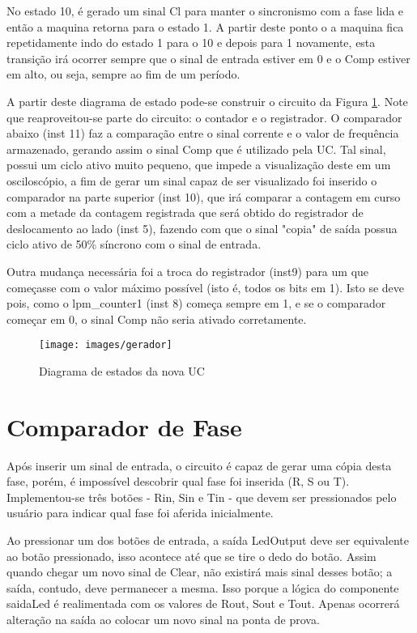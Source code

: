 \documentclass[12pt,a4paper,openany]{abntex2}
\begin{document}
No estado 10, é gerado um sinal Cl para manter o sincronismo com a fase lida e então a maquina retorna para o estado 1. A partir deste ponto o a maquina fica repetidamente indo do estado 1 para o 10 e  depois para 1 novamente, esta transição irá ocorrer sempre que o sinal de entrada estiver em 0 e o Comp estiver em alto, ou seja, sempre ao fim de um período.

A partir deste diagrama de estado pode-se construir o circuito da Figura \ref{fig:gerador}. Note que reaproveitou-se parte do circuito: o contador e o registrador. O comparador abaixo (inst 11) faz a comparação entre o sinal corrente e o valor de frequência armazenado, gerando assim o sinal Comp que é utilizado pela UC. Tal sinal, possui um ciclo ativo muito pequeno, que impede a visualização deste em um osciloscópio, a fim de gerar um sinal capaz de ser visualizado foi inserido o comparador na parte superior (inst 10), que irá comparar a contagem em curso com a metade da contagem registrada que será obtido do registrador de deslocamento ao lado (inst 5), fazendo com que o sinal "copia" de saída possua ciclo ativo de 50\% síncrono com o sinal de entrada.

Outra mudança necessária foi a troca do registrador (inst9) para um que começasse com o valor máximo possível (isto é, todos os bits em 1). Isto se deve pois, como o lpm\_counter1 (inst 8) começa sempre em 1, e se o comparador começar em 0, o sinal Comp não seria ativado corretamente.

\begin{figure}[!htp]
	\centering
	\caption{Diagrama de estados da nova UC}
	\texttt{[image: images/gerador]}
	\label{fig:gerador}
\end{figure}

\section{Comparador de Fase}

Após inserir um sinal de entrada, o circuito é capaz de gerar uma cópia desta fase, porém, é impossível descobrir qual fase foi inserida (R, S ou T). Implementou-se três botões - Rin, Sin e Tin - que devem ser pressionados pelo usuário para indicar qual fase foi aferida inicialmente.

Ao pressionar um dos botões de entrada, a saída LedOutput deve ser equivalente ao botão pressionado, isso acontece até que se tire o dedo do botão. Assim quando chegar um novo sinal de Clear, não existirá mais sinal desses botão; a saída, contudo, deve permanecer a mesma. Isso porque a lógica do componente saidaLed é realimentada com os valores de Rout, Sout e Tout. Apenas ocorrerá alteração na saída ao colocar um novo sinal na ponta de prova.
\end{document}
